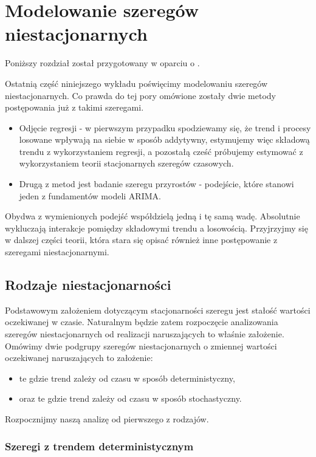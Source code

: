 \documentclass[10pt,a4paper]{book}
\begin{document}
\chapter{Modelowanie szeregów niestacjonarnych}\label{chapter-szeregi-niestacjonarne}

Poniższy rozdział został przygotowany w oparciu o \citep[Rozdział 5]{kirchgassner2012introduction}.

Ostatnią część niniejszego wykładu poświęcimy modelowaniu szeregów niestacjonarnych. Co prawda do tej pory omówione zostały dwie metody postępowania już z takimi szeregami. 
\begin{itemize}
\item Odjęcie regresji - w pierwszym przypadku spodziewamy się, że trend i procesy losowane wpływają na siebie w sposób addytywny, estymujemy więc składową trendu z wykorzystaniem regresji, a pozostałą cześć próbujemy estymować z wykorzystaniem teorii stacjonarnych szeregów czasowych.
\item Drugą z metod jest badanie szeregu przyrostów - podejście, które stanowi jeden z fundamentów modeli ARIMA.
\end{itemize}
Obydwa z wymienionych podejść współdzielą jedną i tę samą wadę. Absolutnie wykluczają interakcje pomiędzy składowymi trendu a losowością. Przyjrzyjmy się w dalszej części teorii, która stara się opisać również inne postępowanie z szeregami niestacjonarnymi.

\section{Rodzaje niestacjonarności}

Podstawowym założeniem dotyczącym stacjonarności szeregu jest stałość wartości oczekiwanej w czasie. Naturalnym będzie zatem rozpoczęcie analizowania szeregów niestacjonarnych od realizacji naruszających to właśnie założenie. 
Omówimy dwie podgrupy szeregów niestacjonarnych o zmiennej wartości oczekiwanej naruszających to założenie:
\begin{itemize}
\item te gdzie trend zależy od czasu w sposób deterministyczny,
\item oraz te gdzie trend zależy od czasu w sposób stochastyczny.
\end{itemize}

Rozpocznijmy naszą analizę od pierwszego z rodzajów.

\subsection{Szeregi z trendem deterministycznym}
\end{document}
